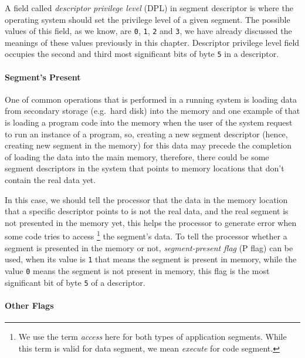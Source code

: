 A field called \emph{descriptor privilege level} (DPL) in segment
descriptor is where the operating system should set the privilege level
of a given segment. The possible values of this field, as we know, are
\lstinline!0!, \lstinline!1!, \lstinline!2! and \lstinline!3!, we have
already discussed the meanings of these values previously in this
chapter. Descriptor privilege level field occupies the second and third
most significant bits of byte \lstinline!5! in a descriptor.

\paragraph{Segment's Present}\label{segments-present}

One of common operations that is performed in a running system is
loading data from secondary storage (e.g.~hard disk) into the memory and
one example of that is loading a program code into the memory when the
user of the system request to run an instance of a program, so, creating
a new segment descriptor (hence, creating new segment in the memory) for
this data may precede the completion of loading the data into the main
memory, therefore, there could be some segment descriptors in the system
that points to memory locations that don't contain the real data yet.

In this case, we should tell the processor that the data in the memory
location that a specific descriptor points to is not the real data, and
the real segment is not presented in the memory yet, this helps the
processor to generate error when some code tries to access \footnote{We
  use the term \emph{access} here for both types of application
  segments. While this term is valid for data segment, we mean
  \emph{execute} for code segment.} the segment's data. To tell the
processor whether a segment is presented in the memory or not,
\emph{segment-present flag} (P flag) can be used, when its value is
\lstinline!1! that means the segment is present in memory, while the
value \lstinline!0! means the segment is not present in memory, this
flag is the most significant bit of byte \lstinline!5! of a descriptor.

\paragraph{Other Flags}\label{other-flags}


